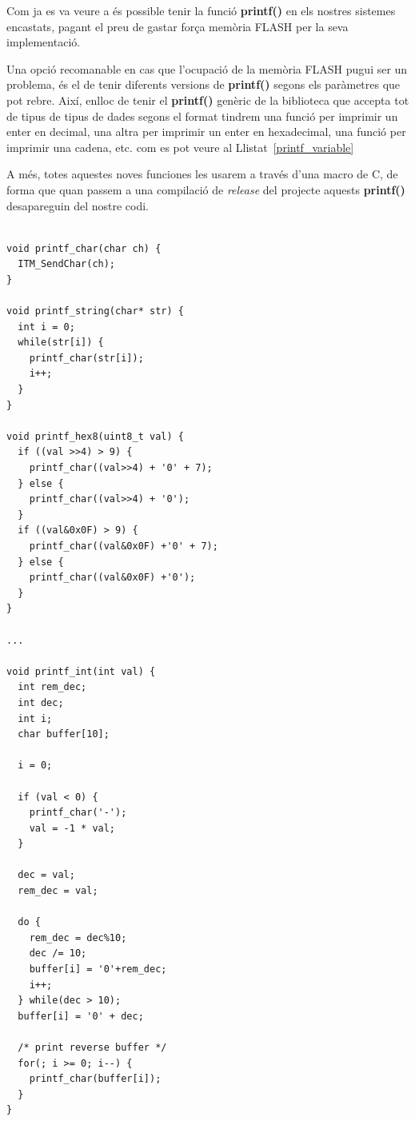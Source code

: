 Com ja es va veure a  és possible tenir la funció {\bf printf()} en els nostres sistemes encastats, pagant el preu de gastar força memòria \gls{FLASH} per la seva implementació.

Una opció recomanable en cas que l'ocupació de la memòria FLASH pugui ser un problema, és el de tenir diferents versions de {\bf printf()} segons els paràmetres que pot rebre. Així, enlloc de tenir el {\bf printf()} genèric de la biblioteca que accepta tot de tipus de tipus de dades segons el format tindrem una funció per imprimir un enter en decimal, una altra per imprimir un enter en hexadecimal, una funció per imprimir una cadena, etc. com es pot veure al Llistat~\ref{printf_variable}

A més, totes aquestes noves funciones les usarem a través d'una \gls{macro} de C, de forma que quan passem a una compilació de {\em release} del projecte aquests {\bf printf()} desapareguin del nostre codi. 

\begin{lstlisting}[style=customc,caption={Diferents implementacions de {\bf printf()}},label=printf_variable]

void printf_char(char ch) {
  ITM_SendChar(ch);
}

void printf_string(char* str) {
  int i = 0;
  while(str[i]) {
    printf_char(str[i]);
    i++;
  }
}

void printf_hex8(uint8_t val) {
  if ((val >>4) > 9) {
    printf_char((val>>4) + '0' + 7);
  } else {
    printf_char((val>>4) + '0');
  }
  if ((val&0x0F) > 9) {
    printf_char((val&0x0F) +'0' + 7);
  } else {
    printf_char((val&0x0F) +'0');
  }
}

...

void printf_int(int val) {
  int rem_dec;
  int dec;
  int i;
  char buffer[10];
    
  i = 0;
    
  if (val < 0) {
    printf_char('-');
    val = -1 * val;
  }

  dec = val;
  rem_dec = val;

  do {
    rem_dec = dec%10; 
    dec /= 10; 
    buffer[i] = '0'+rem_dec;
    i++;
  } while(dec > 10);
  buffer[i] = '0' + dec;

  /* print reverse buffer */
  for(; i >= 0; i--) {
    printf_char(buffer[i]);
  }
}
\end{lstlisting}

